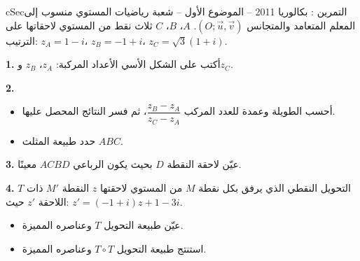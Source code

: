 \documentclass[12pt,a4paper]{article}
\newenvironment{BOX}[2]{\begin{otherlanguage}{english}\begin{arbox}{#1}{#2}}{\end{arbox}\end{otherlanguage}}
\newcounter{exo}
\newenvironment{tamrin}[1]{\stepcounter{exo}\begin{BOX}{cSec}{التمرين \theexo: #1}}{\end{BOX}}
\newenvironment{sq}{\begin{itemize}[leftmargin=2.4em,itemsep=3pt]}{\end{itemize}}
\newcommand{\qa}{\item[(أ)]}\newcommand{\qb}{\item[(ب)]}\newcommand{\qc}{\item[(جـ)]}\newcommand{\qd}{\item[(د)]}\newcommand{\qe}{\item[(هـ)]}
\newcommand{\QQ}[1]{\par\smallskip\textbf{#1.} }
\begin{document}
\begin{tamrin}{بكالوريا 2011 -- الموضوع الأول -- شعبة رياضيات}
المستوي منسوب إلى المعلم المتعامد والمتجانس $(O;\vec u,\vec v)$. $A$، $B$، $C$ ثلاث نقط من المستوي لاحقاتها على الترتيب: $z_A=1-i$، $z_B=-1+i$، $z_C=\sqrt3(1+i)$.
\QQ{1} أكتب على الشكل الأسي الأعداد المركبة: $z_A$، $z_B$ و$z_C$.
\QQ{2}
\begin{sq}
\qa أحسب الطويلة وعمدة للعدد المركب $\dfrac{z_B-z_A}{z_C-z_A}$، ثم فسر النتائج المحصل عليها.
\qb حدد طبيعة المثلث $ABC$.
\end{sq}
\QQ{3} عيّن لاحقة النقطة $D$ بحيث يكون الرباعي $ACBD$ معينًا.
\QQ{4} $T$ التحويل النقطي الذي يرفق بكل نقطة $M$ من المستوي لاحقتها $z$ النقطة $M'$ ذات اللاحقة $z'$ حيث: $z'=(-1+i)z+1-3i$.
\begin{sq}
\qa عيّن طبيعة التحويل $T$ وعناصره المميزة.
\qb استنتج طبيعة التحويل $T\circ T$ وعناصره المميزة.
\end{sq}
\end{tamrin}
\end{document}
